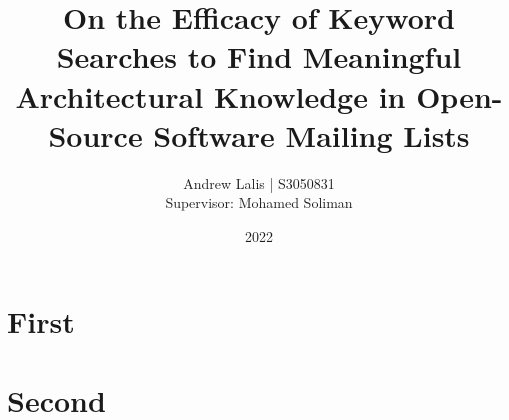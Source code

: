 \documentclass[a4paper, 12pt]{article}
\title{On the Efficacy of Keyword Searches to Find Meaningful Architectural Knowledge in Open-Source Software Mailing Lists}
\date{2022}
\author{Andrew Lalis | S3050831\\Supervisor: Mohamed Soliman}
\begin{document}
\maketitle

\section{First}

\section{Second}
\end{document}
